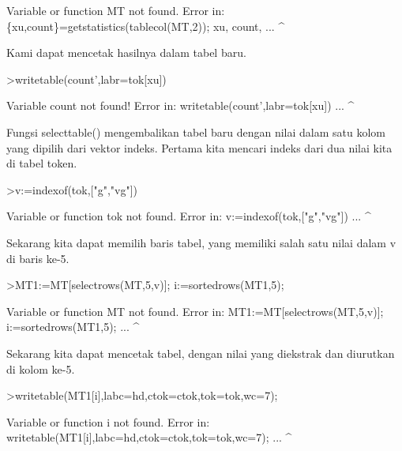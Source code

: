 \documentclass{article}
\begin{document}
\begin{eulernotebook}
\begin{eulercomment}
\begin{eulercomment}
\begin{euleroutput}
  Variable or function MT not found.
  Error in:
  \{xu,count\}=getstatistics(tablecol(MT,2)); xu, count, ...
                                      ^
\end{euleroutput}
\begin{eulercomment}
Kami dapat mencetak hasilnya dalam tabel baru.
\end{eulercomment}
\begin{eulerprompt}
>writetable(count',labr=tok[xu])
\end{eulerprompt}
\begin{euleroutput}
  Variable count not found!
  Error in:
  writetable(count',labr=tok[xu]) ...
                   ^
\end{euleroutput}
\begin{eulercomment}
Fungsi selecttable() mengembalikan tabel baru dengan nilai dalam satu
kolom yang dipilih dari vektor indeks. Pertama kita mencari indeks
dari dua nilai kita di tabel token.
\end{eulercomment}
\begin{eulerprompt}
>v:=indexof(tok,["g","vg"])
\end{eulerprompt}
\begin{euleroutput}
  Variable or function tok not found.
  Error in:
  v:=indexof(tok,["g","vg"]) ...
                ^
\end{euleroutput}
\begin{eulercomment}
Sekarang kita dapat memilih baris tabel, yang memiliki salah satu
nilai dalam v di baris ke-5.
\end{eulercomment}
\begin{eulerprompt}
>MT1:=MT[selectrows(MT,5,v)]; i:=sortedrows(MT1,5);
\end{eulerprompt}
\begin{euleroutput}
  Variable or function MT not found.
  Error in:
  MT1:=MT[selectrows(MT,5,v)]; i:=sortedrows(MT1,5); ...
                       ^
\end{euleroutput}
\begin{eulercomment}
Sekarang kita dapat mencetak tabel, dengan nilai yang diekstrak dan
diurutkan di kolom ke-5.
\end{eulercomment}
\begin{eulerprompt}
>writetable(MT1[i],labc=hd,ctok=ctok,tok=tok,wc=7);
\end{eulerprompt}
\begin{euleroutput}
  Variable or function i not found.
  Error in:
  writetable(MT1[i],labc=hd,ctok=ctok,tok=tok,wc=7); ...
                  ^

\end{euleroutput}
\end{eulercomment}
\end{eulercomment}
\end{eulernotebook}
\end{document}

